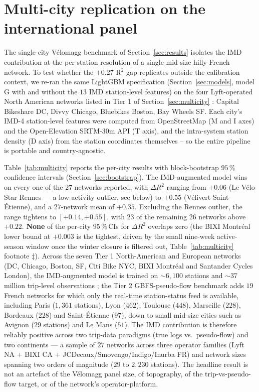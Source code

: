 \documentclass[11pt,a4paper]{article}
\begin{document}
\section{Multi-city replication on the international panel}
\label{sec:multicity-results}

The single-city V\'elomagg benchmark of Section~\ref{sec:results}
isolates the IMD contribution at the per-station resolution of a
single mid-size hilly French network.  To test whether the
$+0.27$ R$^2$ gap replicates outside the calibration context, we
re-ran the same LightGBM specification (Section~\ref{sec:models},
model G with and without the $13$ IMD station-level features) on
the four Lyft-operated North American networks listed in
Tier 1 of Section~\ref{sec:multicity} : Capital Bikeshare DC,
Divvy Chicago, Bluebikes Boston, Bay Wheels SF.  Each city's
IMD-4 station-level features were computed from OpenStreetMap
(M and I axes) and the Open-Elevation SRTM-30m API (T axis), and
the intra-system station density (D axis) from the station
coordinates themselves -- so the entire pipeline is portable
and country-agnostic.

Table~\ref{tab:multicity} reports the per-city results with
block-bootstrap $95\,\%$ confidence intervals
(Section~\ref{sec:bootstrap}).  The IMD-augmented model wins on
every one of the $27$ networks reported, with $\Delta R^2$
ranging from $+0.06$ (Le V\'elo Star Rennes — a low-activity
outlier, see below) to $+0.55$ (V\'elivert Saint-\'Etienne), and a
$27$-network mean of $+0.35$.  Excluding the Rennes outlier, the
range tightens to $[+0.14, +0.55]$, with $23$ of the remaining
$26$ networks above $+0.22$.  \textbf{None} of the per-city
$95\,\%$\,CIs for $\Delta R^2$ overlaps zero (the BIXI Montr\'eal
lower bound at $+0.003$ is the tightest, driven by the small
nine-week active-season window once the winter closure is
filtered out, Table~\ref{tab:multicity} footnote $\ddagger$).
Across the seven Tier 1 North-American and European networks (DC,
Chicago, Boston, SF, Citi Bike NYC, BIXI Montr\'eal and Santander
Cycles London), the IMD-augmented model is trained on
$\sim 6{,}100$ stations and $\sim 37$ million trip-level
observations ; the Tier 2 GBFS-pseudo-flow benchmark
adds $19$ French networks for which only the real-time
station-status feed is available, including Paris
($1{,}361$ stations), Lyon ($462$), Toulouse ($448$),
Marseille ($228$), Bordeaux ($228$) and Saint-\'Etienne ($97$),
down to small mid-size cities such as Avignon ($29$ stations)
and Le Mans ($51$).  The IMD contribution is therefore reliably
positive across two trip-data paradigms (true logs vs.\
pseudo-flow) and two continents — a sample of $27$ networks
across three operator families (Lyft NA + BIXI CA +
JCDecaux/Smovengo/Indigo/Inurba FR) and network sizes spanning
two orders of magnitude
($29$ to $2{,}230$ stations).  The headline result is not an
artefact of the V\'elomagg panel size, of topography, of the
trip-vs-pseudo-flow target, or of the network's
operator-platform.
\end{document}
